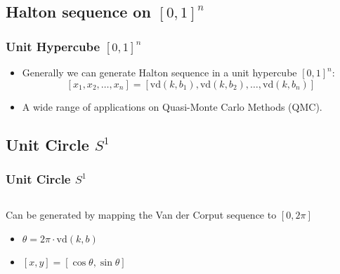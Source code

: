 \documentclass[serif]{beamer} %
\begin{document}
\subsection{Halton sequence on $[0,1]^n$}
\begin{frame}[fragile]
\frametitle{Unit Hypercube $[0,1]^n$}
\begin{itemize}
  \item Generally we can generate Halton sequence in a unit hypercube $[0,1]^n$:
  \[
  [x_1, x_2, \ldots, x_n] = [\mathrm{vd}(k,b_1), \mathrm{vd}(k,b_2), \ldots, \mathrm{vd}(k,b_n)]
  \]
  \item A wide range of applications on Quasi-Monte Carlo Methods (QMC).
\end{itemize}
\end{frame}

\subsection{Unit Circle $S^1$}
\begin{frame}[fragile]
\frametitle{Unit Circle $S^1$}
\begin{columns}
\begin{column}{0.6\textwidth}
  Can be generated by mapping the Van der Corput sequence to $ [0, 2\pi]$
  \begin{itemize}
    \item $\theta = 2\pi \cdot \mathrm{vd}(k,b)$
    \item $[x, y] = [\cos\theta, \sin\theta]$
  \end{itemize}
\end{column}
\begin{column}{0.4\textwidth}
\end{column}
\end{columns}
\end{frame}
\end{document}
